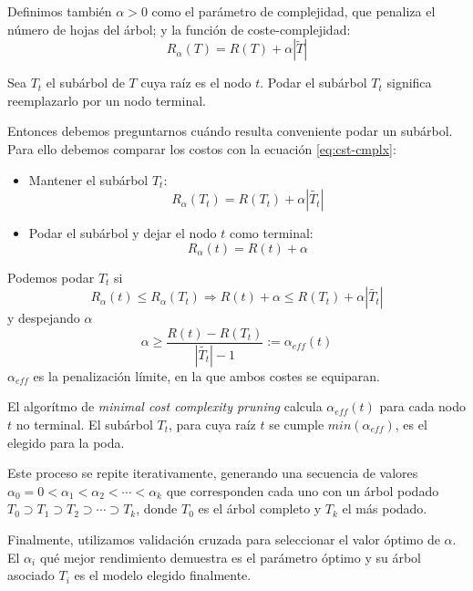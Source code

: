 \documentclass[titlepage, 11pt]{book}
\begin{document}
Definimos también $\alpha>0$ como el parámetro de complejidad, que penaliza el número de hojas del árbol; y la función de coste-complejidad:
\begin{equation}
    R_\alpha(T) = R(T) + \alpha|\tilde{T}|
    \label{eq:cst-cmplx}
\end{equation}

Sea $T_t$ el subárbol de $T$ cuya raíz es el nodo $t$. Podar el subárbol $T_t$ significa reemplazarlo por un nodo terminal.

Entonces debemos preguntarnos cuándo resulta conveniente podar un subárbol. Para ello debemos comparar los costos con la ecuación \ref{eq:cst-cmplx}:

\begin{itemize}
    \item Mantener el subárbol $T_t$:
    \begin{equation*}
        R_\alpha(T_t)=R(T_t)+\alpha|\tilde{T_t}|
    \end{equation*}
    \item Podar el subárbol y dejar el nodo $t$ como terminal:
    \begin{equation*}
        R_\alpha(t)=R(t)+\alpha
    \end{equation*}
\end{itemize}

Podemos podar $T_t$ si
\begin{equation*}
    R_\alpha(t) \leq R_\alpha(T_t) \Rightarrow  R(t) + \alpha \leq R(T_t) + \alpha |\tilde{T_t}|
\end{equation*}
y despejando $\alpha$
\begin{equation}
    \alpha \geq \frac{R(t)-R(T_t)}{|\tilde{T_t}|-1}:=\alpha_{eff}(t)
\end{equation}
$\alpha_{eff}$ es la penalización límite, en la que ambos costes se equiparan.

El algorítmo de \textit{minimal cost complexity pruning} calcula $\alpha_{eff}(t)$ para cada nodo $t$ no terminal. El subárbol $T_t$, para cuya raíz $t$ se cumple $min(\alpha_{eff})$, es el elegido para la poda.

Este proceso se repite iterativamente, generando una secuencia de valores $\alpha_0=0<\alpha_1<\alpha_2<\cdots<\alpha_k$ que corresponden cada uno con un árbol podado $T_0 \supset T_1 \supset T_2 \supset \cdots \supset T_k$, donde $T_0$ es el árbol completo y $T_k$ el más podado.

Finalmente, utilizamos validación cruzada para seleccionar el valor óptimo de $\alpha$. El $\alpha_i$ qué mejor rendimiento demuestra es el parámetro óptimo y su árbol asociado $T_i$ es el modelo elegido finalmente.
\end{document}
